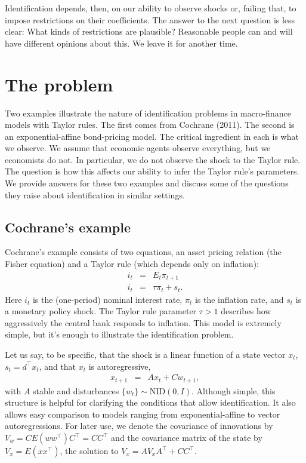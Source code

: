 \documentclass[11pt]{article}
\newcounter{tab}
\begin{document}
{Identification depends, then,
on our ability to observe shocks or, failing that, to impose restrictions
on their coefficients.
The answer to the next question is less clear:
What kinds of restrictions are plausible?
Reasonable people can and will have different opinions about this.
We leave it for another time.


\section{The problem}
\label{sec:examples}

Two examples illustrate the nature of identification problems in
macro-finance models with Taylor rules.
The first comes from Cochrane (2011).
The second is an exponential-affine bond-pricing model.
The critical ingredient in each is what we observe.
We assume that economic agents observe everything,
but we economists do not.
In particular, we do not observe the shock to the Taylor rule.
The question is how this affects our ability to
infer the Taylor rule's parameters.
We provide answers for these two examples and
discuss some of the questions they raise about identification
in similar settings.


\subsection{Cochrane's example}
\label{sec:example-cochrane}

Cochrane's example consists of two equations,
an asset pricing relation (the Fisher equation)
and a Taylor rule (which depends only on inflation):
\begin{eqnarray}
    i_t &=& E_t \pi_{t+1} %
        \label{eq:cochrane-euler} \\
    i_t &=& \tau \pi_t + s_{t} .
        \label{eq:cochrane-taylor}
\end{eqnarray}
Here $i_t$ is the (one-period) nominal interest rate,
$\pi_t$ is the inflation rate,
and $s_t$ is a monetary policy shock.
The Taylor rule parameter $\tau>1$ describes how aggressively
the central bank responds to inflation.
This model is extremely simple,
but it's enough to illustrate the identification problem.

Let us say, to be specific, that
the shock is a linear function of a state vector $x_t$,
$s_t = d^\top x_t$,
and that $x_t$ is autoregressive,
\begin{eqnarray}
    x_{t+1} &=&  A  x_t + C w_{t+1} ,
    \label{eq:state-dynamics}
\end{eqnarray}
with $ A $ stable and disturbances $\{ w_t \} \sim \mbox{NID}(0,I)$.
Although simple, this structure is helpful
for clarifying the conditions that allow identification.
It also allows easy comparison to models ranging
from exponential-affine to vector autoregressions.
For later use, we denote the covariance of innovations by
$ V_w = C E(w w^\top)C^\top = C C^\top $
and the covariance matrix of the state by $V_x= E(x x^\top)$,
the solution to $V_x = AV_x A^{\top} +CC^{\top}$.


}
\end{document}
